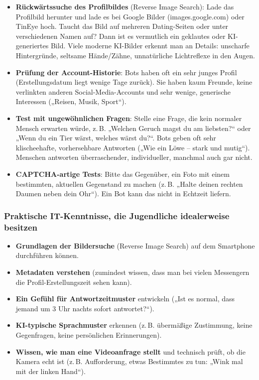 \documentclass[12pt,a4paper,oneside]{scrartcl}
\begin{document}
	\begin{itemize}
		\item \textbf{Rückwärtssuche des Profilbildes} (Reverse Image Search): Lade das Profilbild herunter und lade es bei Google Bilder (images.google.com) oder TinEye hoch. Taucht das Bild auf mehreren Dating-Seiten oder unter verschiedenen Namen auf? Dann ist es vermutlich ein geklautes oder KI-generiertes Bild. Viele moderne KI-Bilder erkennt man an Details: unscharfe Hintergründe, seltsame Hände/Zähne, unnatürliche Lichtreflexe in den Augen.
		\item \textbf{Prüfung der Account-Historie}: Bots haben oft ein sehr junges Profil (Erstellungsdatum liegt wenige Tage zurück). Sie haben kaum Freunde, keine verlinkten anderen Social-Media-Accounts und sehr wenige, generische Interessen („Reisen, Musik, Sport“).
		\item \textbf{Test mit ungewöhnlichen Fragen}: Stelle eine Frage, die kein normaler Mensch erwarten würde, z.\,B. „Welchen Geruch magst du am liebsten?“ oder „Wenn du ein Tier wärst, welches wärst du?“. Bots geben oft sehr klischeehafte, vorhersehbare Antworten („Wie ein Löwe – stark und mutig“). Menschen antworten überraschender, individueller, manchmal auch gar nicht.
		\item \textbf{CAPTCHA-artige Tests}: Bitte das Gegenüber, ein Foto mit einem bestimmten, aktuellen Gegenstand zu machen (z.\,B. „Halte deinen rechten Daumen neben dein Ohr“). Ein Bot kann das nicht in Echtzeit liefern.
	\end{itemize}
	
	\subsubsection{Praktische IT-Kenntnisse, die Jugendliche idealerweise besitzen}
	
	\begin{itemize}
		\item \textbf{Grundlagen der Bildersuche} (Reverse Image Search) auf dem Smartphone durchführen können.
		\item \textbf{Metadaten verstehen} (zumindest wissen, dass man bei vielen Messengern die Profil-Erstellungszeit sehen kann).
		\item \textbf{Ein Gefühl für Antwortzeitmuster} entwickeln („Ist es normal, dass jemand um 3 Uhr nachts sofort antwortet?“).
		\item \textbf{KI-typische Sprachmuster} erkennen (z.\,B. übermäßige Zustimmung, keine Gegenfragen, keine persönlichen Erinnerungen).
		\item \textbf{Wissen, wie man eine Videoanfrage stellt} und technisch prüft, ob die Kamera echt ist (z.\,B. Aufforderung, etwas Bestimmtes zu tun: „Wink mal mit der linken Hand“).
	\end{itemize}
	
\end{document}
